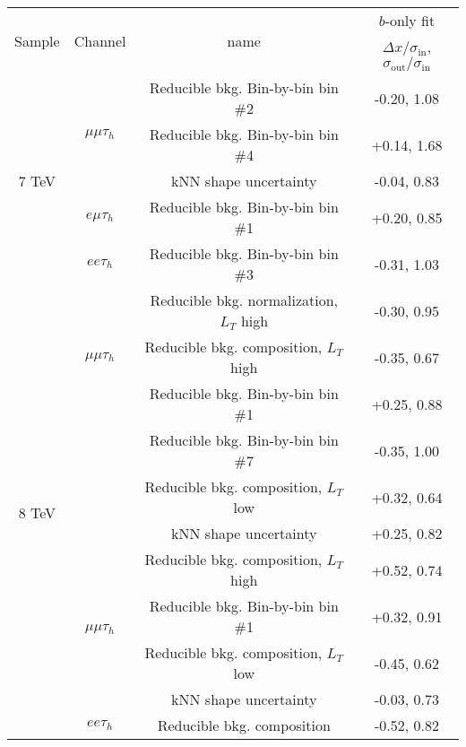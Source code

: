\begin{tabular}{c c c c } \hline 
\multirow{2}{*}{ Sample } & \multirow{2}{*}{Channel} & \multirow{2}{*}{name} &     $b$-only fit \\
 &  & &  $\Delta x/\sigma_{\text{in}}$, $\sigma_{\text{out}}/\sigma_{\text{in}}$ \\  
\hline
\multirow{5}{*}{ 7 TeV } & \multirow{3}{*}{ $\mu\mu\tau_h$ } & Reducible bkg. Bin-by-bin bin \#2   &      -0.20, 1.08 \\
& & Reducible bkg. Bin-by-bin bin \#4      &      +0.14, 1.68 \\
& & kNN shape uncertainty           &      -0.04, 0.83 \\
 \cline{2-4}
& $e\mu\tau_h$ & Reducible bkg. Bin-by-bin bin \#1      &      +0.20, 0.85 \\
 \cline{2-4}
& $ee\tau_h$ & Reducible bkg. Bin-by-bin bin \#3      &      -0.31, 1.03 \\
 \hline
\multirow{11}{*}{ 8 TeV } & \multirow{3}{*}{ $\mu\mu\tau_h$ } & Reducible bkg. normalization, $L_T$ high   &      -0.30, 0.95 \\
& & Reducible bkg. composition, $L_T$ high    &      -0.35, 0.67  \\
& & Reducible bkg. Bin-by-bin bin \#1 &      +0.25, 0.88 \\
& & Reducible bkg. Bin-by-bin bin \#7 &      -0.35, 1.00 \\
& & Reducible bkg. composition, $L_T$ low     &      +0.32, 0.64  \\
& & kNN shape uncertainty          &      +0.25, 0.82  \\
 \cline{2-4}
& \multirow{4}{*}{ $\mu\mu\tau_h$ } & Reducible bkg. composition, $L_T$ high    &      +0.52, 0.74 \\
& & Reducible bkg. Bin-by-bin bin \#1 &      +0.32, 0.91 \\
& & Reducible bkg. composition, $L_T$ low     &      -0.45, 0.62  \\
& & kNN shape uncertainty          &      -0.03, 0.73  \\
 \cline{2-4}
& $ee\tau_h$ & Reducible bkg. composition           &      -0.52, 0.82 \\
 \hline
\end{tabular}
